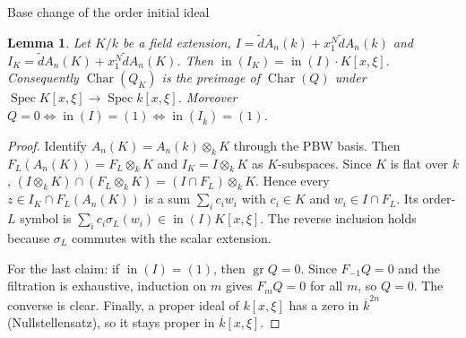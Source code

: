 \documentclass[11pt]{amsart}
\numberwithin{equation}{section}
\newtheorem{lemma}[theorem]{Lemma}
\theoremstyle{plain}
\theoremstyle{remark}
\newcommand{\Char}{\operatorname{Char}}
\newcommand{\gr}{\operatorname{gr}}
\newcommand{\Spec}{\operatorname{Spec}}
\newcommand{\Kbar}{\overline{k}}
\begin{document}
\begin{AIaddition}{Base change of the order initial ideal}
\begin{lemma}\label{lem:initial-base-change}
Let $K/k$ be a field extension, $I=\tilde dA_n(k)+x_1^N\tilde dA_n(k)$ and
$I_K=\tilde dA_n(K)+x_1^N\tilde dA_n(K)$. Then
$\operatorname{in}(I_K)=\operatorname{in}(I)\cdot K[x,\xi]$.
Consequently $\Char(Q_K)$ is the preimage of $\Char(Q)$ under
$\Spec K[x,\xi]\to\Spec k[x,\xi]$. Moreover
$Q=0\iff\operatorname{in}(I)=(1)\iff\operatorname{in}(I_{\Kbar})=(1)$.
\end{lemma}
\begin{proof}
Identify $A_n(K)=A_n(k)\otimes_kK$ through the PBW basis. Then
$F_L(A_n(K))=F_L\otimes_kK$ and $I_K=I\otimes_kK$ as $K$-subspaces. Since
$K$ is flat over $k$,
$(I\otimes_kK)\cap(F_L\otimes_kK)=(I\cap F_L)\otimes_kK$. Hence every
$z\in I_K\cap F_L(A_n(K))$ is a sum $\sum_ic_iw_i$ with $c_i\in K$ and
$w_i\in I\cap F_L$. Its order-$L$ symbol is
$\sum_ic_i\sigma_L(w_i)\in\operatorname{in}(I)K[x,\xi]$. The reverse
inclusion holds because $\sigma_L$ commutes with the scalar extension.

For the last claim: if $\operatorname{in}(I)=(1)$, then $\gr Q=0$. Since
$F_{-1}Q=0$ and the filtration is exhaustive, induction on $m$ gives
$F_mQ=0$ for all $m$, so $Q=0$. The converse is clear. Finally, a proper
ideal of $k[x,\xi]$ has a zero in $\Kbar^{2n}$ (Nullstellensatz), so it
stays proper in $\Kbar[x,\xi]$.
\end{proof}
\end{AIaddition}
\end{document}
